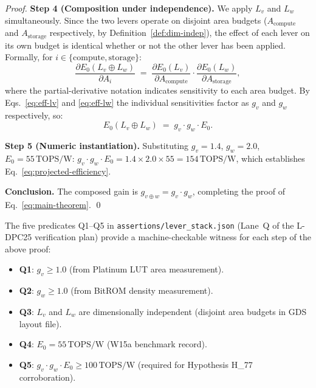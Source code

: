 \begin{proof}
  \textbf{Step 4 (Composition under independence).}
  We apply $L_v$ and $L_w$ simultaneously.
  Since the two levers operate on disjoint area budgets
  ($A_{\text{compute}}$ and $A_{\text{storage}}$ respectively, by
  Definition~\ref{def:dim-indep}), the effect of each lever on its own budget
  is identical whether or not the other lever has been applied.
  Formally, for $i \in \{\text{compute}, \text{storage}\}$:
  \begin{equation}
    \frac{\partial E_0(L_v \oplus L_w)}{\partial A_i}
    \;=\;
    \frac{\partial E_0(L_v)}{\partial A_{\text{compute}}} \cdot
    \frac{\partial E_0(L_w)}{\partial A_{\text{storage}}},
    \label{eq:independence-cond}
  \end{equation}
  where the partial-derivative notation indicates sensitivity to each area budget.
  By Eqs.~\eqref{eq:eff-lv} and \eqref{eq:eff-lw} the individual sensitivities
  factor as $g_v$ and $g_w$ respectively, so:
  \begin{equation}
    E_0(L_v \oplus L_w) \;=\; g_v \cdot g_w \cdot E_0.
    \label{eq:composed-eff}
  \end{equation}

  \textbf{Step 5 (Numeric instantiation).}
  Substituting $g_v = 1.4$, $g_w = 2.0$, $E_0 = 55\,\text{TOPS/W}$:
  $g_v \cdot g_w \cdot E_0 = 1.4 \times 2.0 \times 55 = 154\,\text{TOPS/W}$,
  which establishes Eq.~\eqref{eq:projected-efficiency}.

  \textbf{Conclusion.}
  The composed gain is $g_{v \oplus w} = g_v \cdot g_w$, completing the proof
  of Eq.~\eqref{eq:main-theorem}. \qed
\end{proof}

\begin{remark}
  \label{rem:lane-q}
  The five predicates Q1--Q5 in \texttt{assertions/lever\_stack.json}
  (Lane~Q of the L-DPC25 verification plan) provide a machine-checkable
  witness for each step of the above proof:
  \begin{itemize}
    \item \textbf{Q1}: $g_v \geq 1.0$ (from Platinum LUT area measurement).
    \item \textbf{Q2}: $g_w \geq 1.0$ (from BitROM density measurement).
    \item \textbf{Q3}: $L_v$ and $L_w$ are dimensionally independent
          (disjoint area budgets in GDS layout file).
    \item \textbf{Q4}: $E_0 = 55\,\text{TOPS/W}$ (W15a benchmark record).
    \item \textbf{Q5}: $g_v \cdot g_w \cdot E_0 \geq 100\,\text{TOPS/W}$
          (required for Hypothesis H\_77 corroboration).
  \end{itemize}
\end{remark}


